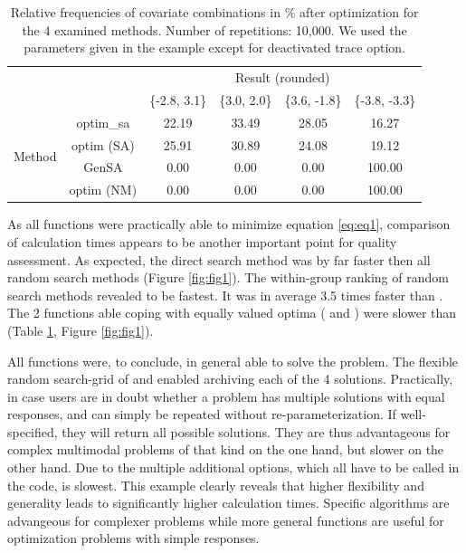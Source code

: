 \begin{table}[]
	\centering
	\caption{Relative frequencies of covariate combinations in \% after optimization for the 4 examined methods. Number of repetitions: 10,000. We used the parameters given in the example except for deactivated trace option.}
	\label{tab:tab1}
	\begin{tabular}{cccccc} \cline{3-6}
& \multicolumn{1}{c}{} & \multicolumn{4}{c}{Result (rounded)}                    \\ \cline{3-6} 
		&                      & \{-2.8, 3.1\} & \{3.0, 2.0\} & \{3.6, -1.8\} & \{-3.8, -3.3\} \\ \cline{2-6} 
		\multirow{4}{*}{Method} & optim\_sa          & 22.19     & 33.49    & 28.05     & 16.27      \\
		& optim (SA)            & 25.91     & 30.89    & 24.08     & 19.12      \\
		& GenSA              & 0.00      & 0.00     & 0.00      & 100.00     \\
		& optim (NM)          & 0.00      & 0.00     & 0.00      & 100.00     \\ \cline{2-6} 
	\end{tabular}
\end{table}

As all functions were practically able to minimize equation \ref{eq:eq1}, comparison of calculation times appears to be another important point for quality assessment. As expected, the direct search method  was by far faster then all random search methods (Figure \ref{fig:fig1}). The within-group ranking of random search methods revealed  to be fastest. It was in average 3.5 times faster than . The 2 functions able coping with equally valued optima ( and ) were slower than  (Table \ref{tab:tab1}, Figure \ref{fig:fig1}).

All functions were, to conclude, in general able to solve the problem. The flexible random search-grid of  and  enabled archiving each of the 4 solutions. Practically, in case users are in doubt whether a problem has multiple solutions with equal responses,  and  can simply be repeated without re-parameterization. If well-specified, they will return all possible solutions. They are thus advantageous for complex multimodal problems of that kind on the one hand, but slower on the other hand. Due to the multiple additional options, which all have to be called in the code,  is slowest. This example clearly reveals that higher flexibility and generality leads to significantly higher calculation times. Specific algorithms are advangeous for complexer problems while more general functions are useful for optimization problems with simple responses.

